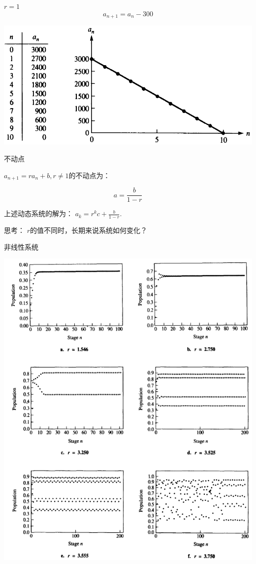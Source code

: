 \documentclass{beamer}
\begin{document}
\begin{frame}{$r = 1$}
\[
a_{n+1} = a_n -300
\]
  \begin{center}
    \includegraphics[width=.8\textwidth{}]{poor.png}
  \end{center}
  
\end{frame}

\begin{frame}{不动点}

$a_{n+1} = ra_n + b, r \neq 1$的不动点为：

\[
a = \frac{b}{1-r}
\]

上述动态系统的解为： $a_k=r^kc+\frac{b}{1-r}$.

思考： $r$的值不同时，长期来说系统如何变化？
  
\end{frame}

\begin{frame}{非线性系统}
  \begin{center}
    \includegraphics[width=.5\textwidth{}]{nonlinear.png}\\
  \end{center}
  
\end{frame}
\end{document}
